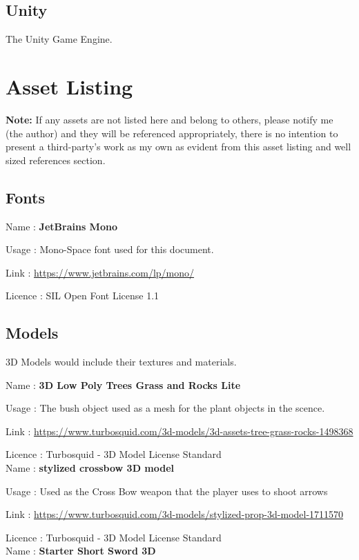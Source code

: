 \documentclass[11pt]{report}
\begin{document}
\section{Unity}
The Unity Game Engine.

\chapter{Asset Listing}
\textbf{Note:} If any assets are not listed here and belong to others, please notify me (the author) and they will be referenced appropriately, there is no intention to present a third-party's work as my own as evident from this asset listing and well sized references section.

\section{Fonts}
Name : \textbf{JetBrains Mono}

Usage : Mono-Space font used for this document.

Link : \url{https://www.jetbrains.com/lp/mono/}

Licence : SIL Open Font License 1.1


\section{Models}
3D Models would include their textures and materials.

Name : \textbf{3D Low Poly Trees Grass and Rocks Lite}

Usage : The bush object used as a mesh for the plant objects in the scence.

Link : \url{https://www.turbosquid.com/3d-models/3d-assets-tree-grass-rocks-1498368}

Licence : Turbosquid - 3D Model License Standard
\\

Name : \textbf{stylized crossbow 3D model}

Usage : Used as the Cross Bow weapon that the player uses to shoot arrows

Link : \url{https://www.turbosquid.com/3d-models/stylized-prop-3d-model-1711570}

Licence : Turbosquid - 3D Model License Standard 
\\

Name : \textbf{Starter Short Sword 3D}
\end{document}
